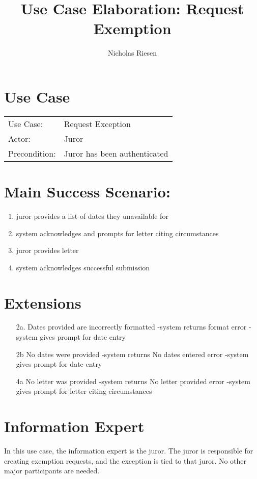 \documentclass{article}
\title{Use Case Elaboration: Request Exemption}
\author{Nicholas Riesen}
\begin{document}
\maketitle

\section*{Use Case}
\begin{tabular}{l l}
  Use Case:     & Request Exception            \\
  Actor:        & Juror                        \\
  Precondition: & Juror has been authenticated \\
\end{tabular}

\section*{Main Success Scenario:}
\begin{enumerate}
  \item juror provides a list of dates they unavailable for
  \item system acknowledges and prompts for letter citing circumstances
  \item juror provides letter
  \item system acknowledges successful submission 
\end{enumerate}

\section*{Extensions}
\begin{itemize}
  \item [2a.] Dates provided are incorrectly formatted
        -system returns format error
        -system gives prompt for date entry
  \item [2b] No dates were provided
        -system returns No dates entered error
        -system gives prompt for date entry
  \item [4a] No letter was provided
        -system returns No letter provided error
        -system gives prompt for letter citing circumstances

\end{itemize}

\section*{Information Expert}
In this use case, the information expert is the juror. The juror is responsible for creating exemption requests, and the exception is tied to that juror. No other major participants are needed. 
\end{document}

